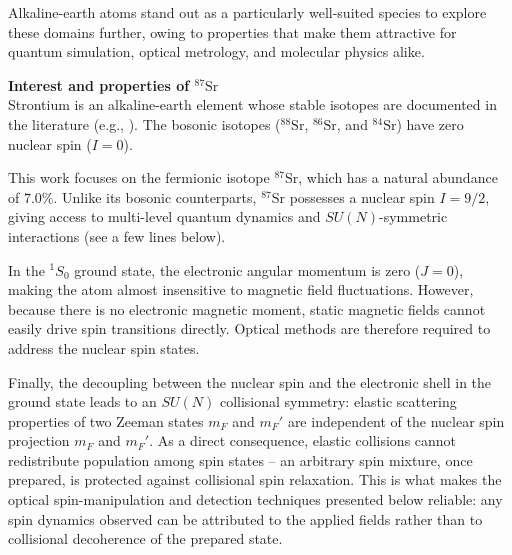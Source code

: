 Alkaline-earth atoms stand out as a particularly well-suited species to explore these domains further, owing to properties that make them attractive for quantum simulation, optical metrology, and molecular physics alike.

\textbf{Interest and properties of $^{87}\text{Sr}$}\\
Strontium is an alkaline-earth element whose stable isotopes are documented in the literature (e.g., \cite{zelevinsky_narrow_2006, blatt_measurement_2011, borkowski_mass_2014, reschovsky_narrow-line_2018}). The bosonic isotopes ($^{88}\text{Sr}$, $^{86}\text{Sr}$, and $^{84}\text{Sr}$) have zero nuclear spin ($I=0$).

This work focuses on the fermionic isotope $^{87}\text{Sr}$, which has a natural abundance of $7.0\%$. Unlike its bosonic counterparts, $^{87}\text{Sr}$ possesses a nuclear spin $I=9/2$, giving access to multi-level quantum dynamics and $SU(N)$-symmetric interactions (see a few lines below).

In the $^1S_0$ ground state, the electronic angular momentum is zero ($J=0$), making the atom almost insensitive to magnetic field fluctuations. However, because there is no electronic magnetic moment, static magnetic fields cannot easily drive spin transitions directly. Optical methods are therefore required to address the nuclear spin states.

Finally, the decoupling between the nuclear spin and the electronic shell in the ground state leads to an $SU(N)$ collisional symmetry: elastic scattering properties of two Zeeman states $m_F$ and $m_F'$ are independent of the nuclear spin projection $m_F$ and $m_F'$. As a direct consequence, elastic collisions cannot redistribute population among spin states -- an arbitrary spin mixture, once prepared, is protected against collisional spin relaxation. This is what makes the optical spin-manipulation and detection techniques presented below reliable: any spin dynamics observed can be attributed to the applied fields rather than to collisional decoherence of the prepared state.
\vspace{0.5em}

